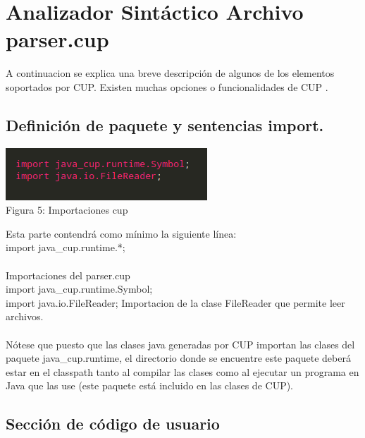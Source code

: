 \documentclass[a4paper,openright,12pt]{article}
\begin{document}
\section{Analizador Sintáctico Archivo parser.cup}

A continuacion se explica una breve descripción de algunos de los elementos soportados por CUP. Existen muchas opciones o funcionalidades de CUP .

\subsection{Definición de paquete y sentencias import.}

\begin{center}
\includegraphics[height=0.08\textheight]{parser1.png}
\\
Figura 5: Importaciones cup
\end{center}

Esta parte contendrá como mínimo la siguiente línea:\\

import java\_cup.runtime.*;\\ \\

Importaciones del parser.cup \\

import java\_cup.runtime.Symbol;\\
import java.io.FileReader; Importacion de la clase FileReader que permite leer archivos.\\ \\
Nótese que puesto que las clases java generadas por CUP importan las clases del paquete java\_cup.runtime, el directorio donde se encuentre este paquete deberá estar en el classpath tanto al compilar las clases como al ejecutar un programa en Java que las use (este paquete está incluido en las clases de CUP).


\subsection{Sección de código de usuario}
\end{document}
